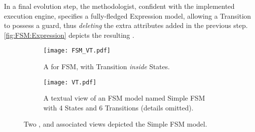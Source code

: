 In a final evolution step, the methodologist, confident with the implemented
execution engine, specifies a fully-fledged \textsf{Expression} model,
allowing a \textsf{Transition} to possess a \textsf{guard}, thus \emph{deleting}
the extra attributes added in the previous step. \autoref{fig:FSM:Expression} depicts the resulting \metamodel.


\begin{figure}
    \centering
    \begin{subfigure}[b]{\columnwidth}
			\centering
      \texttt{[image: FSM\_VT.pdf]}
      \caption{A \viewtype for \textsf{FSM}, with \textsf{Transition} \emph{inside} \textsf{State}s.}
      \label{fig:VT:VMM}
    \end{subfigure}
    \hfill
    \begin{subfigure}[b]{\columnwidth}
			\centering
      \texttt{[image: VT.pdf]}
      \caption{A textual view of an \textsf{FSM} model named \textsf{Simple FSM} with 4 \textsf{States} and 6 \textsf{Transitions} (details omitted).}
      \label{fig:VT:TM}
    \end{subfigure}
    \caption{Two \viewtypes, and associated views depicted the \textsf{Simple FSM} model.}
    \label{fig:VT}
\end{figure}
